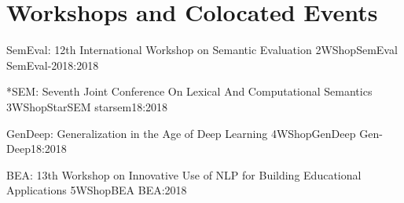 \chapter[Workshops and Colocated Events: \daydate]{Workshops and Colocated Events}
\thispagestyle{emptyheader}





%   


\begin{wsschedule}
  {SemEval: 12th International Workshop on Semantic Evaluation}
  {2}{WShopSemEval}
{SemEval-2018:2018}
  {\WShopLocSemEval}
  
\end{wsschedule}

 \begin{wsschedule}
   {*SEM: Seventh Joint Conference On Lexical And Computational Semantics}
   {3}{WShopStarSEM}
   {starsem18:2018}
   {\WShopLocStarSEM}
   
 \end{wsschedule}


 \clearpage
{}

\begin{wsschedule}
  {GenDeep: Generalization in the Age of Deep Learning}
  {4}{WShopGenDeep}
  {Gen-Deep18:2018}
  {\WShopLocGenDeep}
  
\end{wsschedule}

\begin{wsschedule}
  {BEA: 13th Workshop on Innovative Use of NLP for Building Educational Applications}
  {5}{WShopBEA}
  {BEA:2018}
  {\WShopLocBEA}
  
\end{wsschedule}

